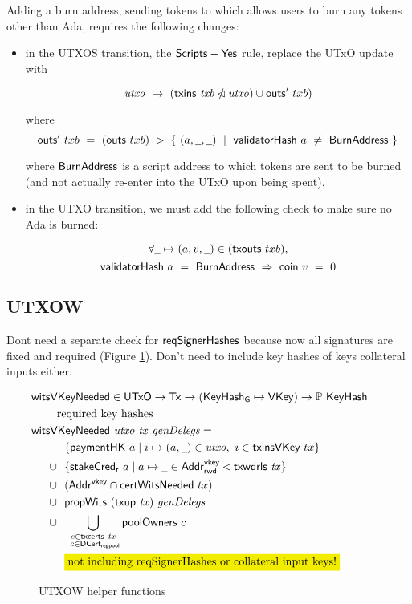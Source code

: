 Adding a burn address, sending tokens to which allows users to burn any tokens other
than Ada, requires the following changes:

\begin{itemize}
  \item in the UTXOS transition, the $\mathsf{Scripts-Yes}$ rule, replace the UTxO update with

  \[\mathit{utxo}~\mapsto~(\mathsf{txins}~ \mathit{txb} \mathbin{\slashed{\lhd}} \mathit{utxo}) \cup \mathsf{outs}'~{txb})\]

  where
  \[\fun{outs}'~{txb}~=~(\fun{outs}~{txb})~\restrictrange~\{~(a,\wcard,\wcard)~\mid~\fun{validatorHash}~a~\neq~\type{BurnAddress}~\}\]

  where $\mathsf{BurnAddress}$ is a script address to which tokens are sent to be burned (and
  not actually re-enter into the UTxO upon being spent).

  \item in the UTXO transition, we must add the following check to make sure no Ada is burned:

  \[ \forall \wcard\mapsto (a,v,\wcard)\in (\fun{txouts}~{txb}),\]
  \[\mathsf{validatorHash}~a~=~\mathsf{BurnAddress}~\Rightarrow~\mathsf{coin}~v~=~0  \]
\end{itemize}

\subsection{UTXOW}

Dont need a separate check for $\mathsf{reqSignerHashes}$ because now all signatures
are fixed and required (Figure \ref{fig:functions-witnesses}). Don't need to
include key hashes of keys collateral inputs either.

\begin{figure}[htb]
  \begin{align*}
    & \hspace{-0.8cm}\fun{witsVKeyNeeded} \in \UTxO \to \Tx \to (\KeyHashGen\mapsto\VKey) \to
      \powerset{\KeyHash} \\
    & \text{required key hashes} \\
    &  \hspace{-0.8cm}\fun{witsVKeyNeeded}~\var{utxo}~\var{tx}~\var{genDelegs} = \\
    & ~~\{ \fun{paymentHK}~a \mid i \mapsto (a, \wcard) \in \var{utxo},~i\in\fun{txinsVKey}~{tx} \} \\
    \cup & ~~
           \{\fun{stakeCred_r}~a\mid a\mapsto \wcard \in \AddrRWDVKey
      \restrictdom \txwdrls{tx}\}\\
    \cup & ~~(\AddrVKey \cap \fun{certWitsNeeded}~{tx}) \\
    \cup & ~~\fun{propWits}~(\fun{txup}~\var{tx})~\var{genDelegs} \\
    \cup & ~~\bigcup_{\substack{c \in \txcerts{tx} \\ ~c \in\DCertRegPool}} \fun{poolOwners}~{c} \\
    & ~~\hldiff{\text{not including reqSignerHashes or collateral input keys!}}
  \end{align*}
  \caption{UTXOW helper functions}
  \label{fig:functions-witnesses}
\end{figure}


